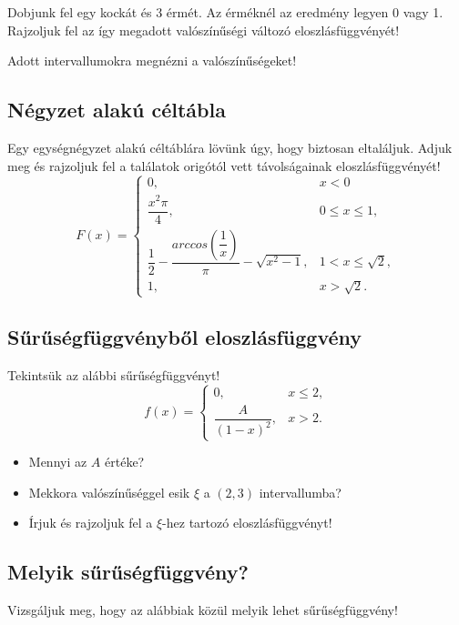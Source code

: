 \documentclass[a4paper]{article}
\begin{document}
Dobjunk fel egy kockát és 3 érmét.
Az érméknél az eredmény legyen 0 vagy 1.
Rajzoljuk fel az így megadott valószínűségi változó eloszlásfüggvényét!

\medskip

Adott intervallumokra megnézni a valószínűségeket!

\subsection{Négyzet alakú céltábla}

Egy egységnégyzet alakú céltáblára lövünk úgy, hogy biztosan eltaláljuk.
Adjuk meg és rajzoljuk fel a találatok origótól vett távolságainak eloszlásfüggvényét!
\[
F(x) = \begin{cases}
0, & x < 0 \\
\dfrac{x^2 \pi}{4}, & 0 \leq x \leq 1, \\
\dfrac{1}{2} - \dfrac{arccos\left(\dfrac{1}{x}\right)}{\pi} - \sqrt{x^2 - 1}, & 1 < x \leq \sqrt{2}, \\
1, & x > \sqrt{2}.
\end{cases}
\]

\subsection{Sűrűségfüggvényből eloszlásfüggvény}

Tekintsük az alábbi sűrűségfüggvényt!
\[
f(x) =
\begin{cases}
0, & x \leq 2, \\
\dfrac{A}{(1 - x)^2}, & x > 2.
\end{cases}
\]
\begin{itemize}
\item Mennyi az $A$ értéke?
\item Mekkora valószínűséggel esik $\xi$ a $(2, 3)$ intervallumba?
\item Írjuk és rajzoljuk fel a $\xi$-hez tartozó eloszlásfüggvényt!
\end{itemize}

\subsection{Melyik sűrűségfüggvény?}

Vizsgáljuk meg, hogy az alábbiak közül melyik lehet sűrűségfüggvény!
\end{document}
